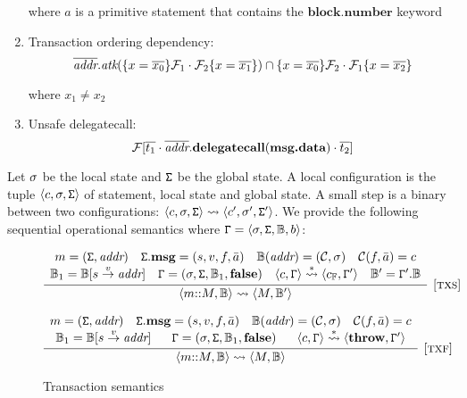 \begin{enumerate}
	where $a$ is a primitive statement that contains the $\textbf{block}.\textbf{number}$ keyword
	
	
	\item Transaction ordering dependency:
	$$
	\overline{\textit{addr}}.\textit{atk}(\{x = \overline{x_0}\}\mathcal{F}_1 \cdot \mathcal{F}_2\{x = \overline{x_1}\}) \cap \{x = \overline{x_0}\}\mathcal{F}_2  \cdot \mathcal{F}_1 \{x = \overline{x_2}\}
	$$
	
	where $x_1 \neq x_2$
	\item Unsafe delegatecall:
	$$
	\mathcal{F}[\overline{t_1} \cdot \overline{\textit{addr}}.\textbf{delegatecall}(\textbf{msg.data}) \cdot \overline{t_2}]
	$$
\end{enumerate}

Let $\sigma$ be the local state and $\mathtt{\Sigma}$ be the global state. A local configuration is the tuple $\langle c,\sigma,\mathtt{\Sigma} \rangle$ of statement, local state and global state. A small step is a binary between two configurations: $\langle c,\sigma,\mathtt{\Sigma} \rangle \leadsto \langle c',\sigma',\mathtt{\Sigma}' \rangle$. We provide the following sequential operational semantics where $\mathtt{\Gamma} = \langle \sigma,\mathtt{\Sigma},\mathbb{B},b \rangle$:

\begin{figure}
$$
\infer[{[\rname{txs}]}]{\conf{m{::}M,\chain} \leadsto \conf{M,\chain'}}
{
	\begin{array}{c}
	m = (\gstate,\textit{addr})~~~\gstate.\textbf{msg} = (s,v,f,\bar{a})~~~ \chain(\textit{addr}) = (\mathcal{C},\lstate)~~~\mathcal{C}(f,\bar{a}) = c\\
	\chain_1 = \chain[s \stackrel{v}{\rightarrow} \textit{addr}]~~~
	\cstate = (\lstate,\gstate,\chain_1,\textbf{false})~~~
	\conf{c,\cstate} \stackrel{*}{\leadsto} \conf{c_\mathbb{F},\cstate'}~~~
	\chain' = \cstate'.\chain
	\end{array}
}
$$

$$
\infer[{[\rname{txf}]}]{\conf{m{::}M,\chain} \leadsto \conf{M,\chain}}
{
	\begin{array}{c}
	m = (\gstate,\textit{addr})~~~\gstate.\textbf{msg} = (s,v,f,\bar{a})~~~ \chain(\textit{addr}) = (\mathcal{C},\lstate)~~~\mathcal{C}(f,\bar{a}) = c\\
	\chain_1 = \chain[s \stackrel{v}{\rightarrow} \textit{addr}]~~~~~
	\cstate = (\lstate,\gstate,\chain_1,\textbf{false})~~~~~
	\conf{c,\cstate} \stackrel{*}{\leadsto} \conf{\textbf{throw},\cstate'}
	\end{array}
}
$$
\caption{Transaction semantics}\label{fig:tx}
\end{figure}

